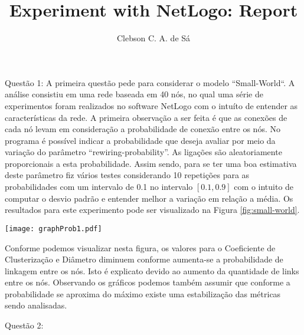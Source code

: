 \documentclass[12pt, letterpaper]{article}
\title{Experiment with NetLogo: Report}
\author{Clebson C. A. de Sá}
\begin{document}
\maketitle

Questão 1: A primeira questão pede para considerar o modelo ``Small-World``.
A análise consistiu em uma rede baseada em 40 nós, no qual uma série de experimentos
foram realizados no software NetLogo com o intuíto de entender as características 
da rede.
A primeira observação a ser feita é que as conexões de cada nó levam em 
consideração a probabilidade de conexão entre os nós. No programa é possível
indicar a probabilidade que deseja avaliar por meio da variação do 
parâmetro ``rewiring-probability''.
As ligações são aleatoriamente proporcionais a esta probabilidade. Assim sendo,
para se ter uma boa estimativa deste parâmetro fiz vários testes considerando 
10 repetições para as probabilidades com um intervalo de 0.1 no intervalo
$\left[0.1, 0.9\right]$ com o intuito de computar o desvio padrão e entender melhor
a variação em relação a média. 
Os resultados para este experimento pode ser visualizado
na Figura \ref{fig:small-world}.

\begin{figure*}[h]
  \centering
  \texttt{[image: graphProb1.pdf]}
  \caption{Coeficiente de Clusterização e Diâmetro com variação da probabilidade.}
  \label{fig:small-world}
\end{figure*}


Conforme podemos visualizar nesta figura, os valores para o Coeficiente de Clusterização
e Diâmetro diminuem conforme aumenta-se a probabilidade de linkagem entre os nós.
Isto é explicato devido ao aumento da quantidade de links  entre os nós.
Observando os gráficos podemos também assumir que conforme a probabilidade se aproxima
do máximo existe uma estabilização das métricas sendo analisadas.

\line

Questão 2:
\end{document}
